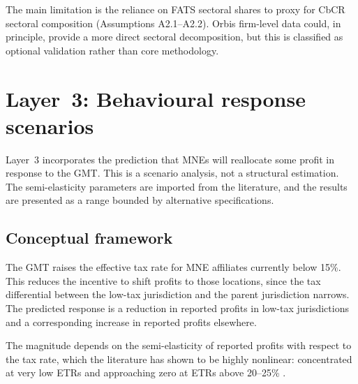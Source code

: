 \documentclass[11pt,a4paper]{article}
\begin{document}
The main limitation is the reliance on FATS sectoral shares to proxy for CbCR sectoral composition (Assumptions A2.1--A2.2). Orbis firm-level data could, in principle, provide a more direct sectoral decomposition, but this is classified as optional validation rather than core methodology.

\section{Layer~3: Behavioural response scenarios}\label{sec:layer3}

Layer~3 incorporates the prediction that MNEs will reallocate some profit in response to the GMT. This is a scenario analysis, not a structural estimation. The semi-elasticity parameters are imported from the literature, and the results are presented as a range bounded by alternative specifications.

\subsection{Conceptual framework}\label{sec:behav_concept}

The GMT raises the effective tax rate for MNE affiliates currently below 15\%. This reduces the incentive to shift profits to those locations, since the tax differential between the low-tax jurisdiction and the parent jurisdiction narrows. The predicted response is a reduction in reported profits in low-tax jurisdictions and a corresponding increase in reported profits elsewhere.

The magnitude depends on the semi-elasticity of reported profits with respect to the tax rate, which the literature has shown to be highly nonlinear: concentrated at very low ETRs and approaching zero at ETRs above 20--25\% \citep{dowd2017,garcia2024}.
\end{document}
